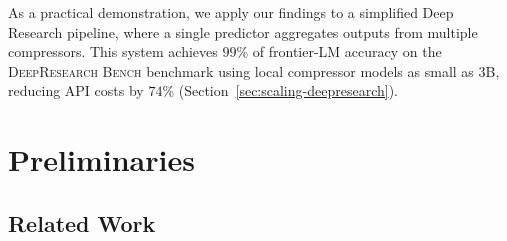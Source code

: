 \documentclass{article} %
\begin{document}
As a practical demonstration, we apply our findings to a simplified Deep Research pipeline, where a single predictor aggregates outputs from multiple compressors. This system achieves $99\%$ of frontier-LM accuracy on the \textsc{DeepResearch Bench} benchmark \citep{du2025deepresearch} using local compressor models as small as 3B, reducing API costs by $74\%$ (Section~\ref{sec:scaling-deepresearch}).

\section{Preliminaries}
\label{sec:preliminaries}

\subsection{Related Work}
\label{sec:related-work}
\end{document}
